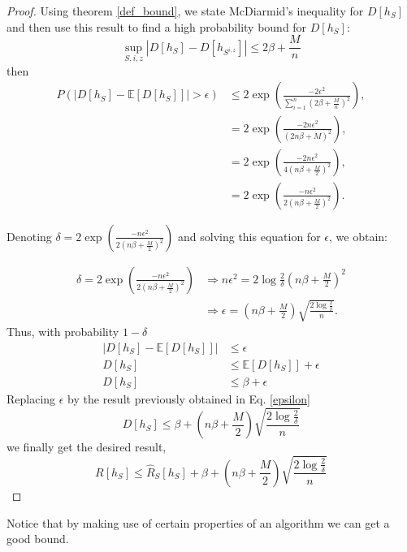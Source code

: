 \documentclass{article}
\begin{document}
\begin{proof}
Using theorem \ref{def_bound}, we state McDiarmid's inequality for $D[h_S]$ and then use this result to find a high probability bound for $D[h_S]$:
\begin{equation}
\sup_{S, i, z} |D[h_S] - D[h_{S^{i, z}}]| \leq 2\beta + \frac{M}{n}
\end{equation}
then 
\begin{equation}
\begin{split}
P(|D[h_S] - \mathbb{E}[D[h_S]]| > \epsilon) & \leq 2\exp \left(\frac{-2\epsilon^2}{\sum_{i=1}^{n}  \left( 2\beta + \frac{M}{n} \right)^2 } \right), \\
& = 2\exp \left(\frac{-2n\epsilon^2}{\left( 2n\beta + M \right)^2 } \right), \\
& = 2\exp \left(\frac{-2n\epsilon^2}{4\left(n\beta + \frac{M}{2} \right)^2 } \right), \\
& = 2\exp \left(\frac{-n\epsilon^2}{2\left(n\beta + \frac{M}{2} \right)^2 } \right).
\end{split}
\end{equation}

Denoting $\delta = 2\exp \left(\frac{-n\epsilon^2}{2\left(n\beta + \frac{M}{2} \right)^2 } \right)$ and solving this equation for $\epsilon$, we obtain:

\begin{equation}\label{epsilon}
\begin{split}
\delta = 2\exp \left(\frac{-n\epsilon^2}{2\left(n\beta + \frac{M}{2} \right)^2 } \right) & \Rightarrow n\epsilon^2 = 2\log\frac{2}{\delta}\left(n\beta + \frac{M}{2} \right)^2 \\
& \Rightarrow \epsilon = \left(n\beta + \frac{M}{2} \right) \sqrt{\frac{2\log\frac{2}{\delta}}{n}}.
\end{split}
\end{equation}
Thus, with probability $1-\delta$ 
\begin{equation*}
\begin{split}
|D[h_S] - \mathbb{E}[D[h_S]]| &\leq \epsilon \\
D[h_S] &\leq \mathbb{E}[D[h_S]] + \epsilon \\
D[h_S] &\leq \beta + \epsilon
\end{split}
\end{equation*}
Replacing $\epsilon$ by the result previously obtained in Eq. \ref{epsilon}
\begin{equation}
D[h_S] \leq \beta + \left(n\beta + \frac{M}{2} \right) \sqrt{\frac{2\log\frac{2}{\delta}}{n}}
\end{equation}
we finally get the desired result,
\begin{equation}
R[h_S] \leq \hat{R}_S[h_S] + \beta + \left(n\beta + \frac{M}{2} \right) \sqrt{\frac{2\log\frac{2}{\delta}}{n}}
\end{equation}
\end{proof}
Notice that by making use of certain properties of an algorithm we can get a good bound.
\end{document}

